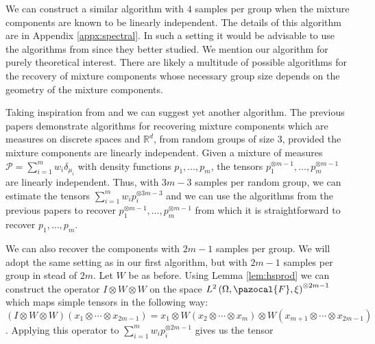 \documentclass[aos,preprint]{imsart}
\def\rn{\mathbb{R}}
\def\sF{\pazocal{F}}
\def\sP{\mathscr{P}}
\theoremstyle{plain}
\theoremstyle{defintion}
\begin{document}
We can construct a similar algorithm with $4$ samples per group when the mixture components are known to be linearly independent. The details of this algorithm are in Appendix \ref{appx:spectral}. In such a setting it would be advisable to use the algorithms from \cite{anandkumar14,song14} since they better studied. We mention our algorithm for purely theoretical interest. There are likely a multitude of possible algorithms for the recovery of mixture components whose necessary group size depends on the geometry of the mixture components.

Taking inspiration from \cite{anandkumar14} and \cite{song14} we can suggest yet another algorithm.  The previous papers demonstrate algorithms for recovering mixture components which are measures on discrete spaces and $\rn^d$, from random groups of size 3, provided the mixture components are linearly independent. Given a mixture of measures $\sP = \sum_{i=1}^m w_i \delta_{\mu_i}$ with density functions $p_1,\ldots,p_m$, the tensors $p_1^{\otimes m-1}, \ldots , p_m^{\otimes m-1}$ are linearly independent. Thus, with $3m-3$ samples per random group, we can estimate the tensors $\sum_{i=1}^{m} w_i p_i^{\otimes 3m-3}$ and we can use the algorithms from the previous papers to recover $p_1^{\otimes m-1},\ldots,p_m^{\otimes m-1}$ from which it is straightforward to recover $p_1,\ldots,p_m$.

We can also recover the components with $2m-1$ samples per group. We will adopt the same setting as in our first algorithm, but with $2m-1$ samples per group in stead of $2m$. Let $W$ be as before. Using Lemma \ref{lem:hsprod} we can construct the operator $I\otimes W \otimes W$ on the space $L^2\left( \Omega,\sF,\xi \right)^{\otimes 2m-1}$ which maps simple tensors in the following way: $(I \otimes W \otimes W)\left( x_1\otimes \cdots \otimes x_{2m-1} \right) = x_1 \otimes W\left( x_2\otimes \cdots \otimes x_{m}  \right) \otimes W\left( x_{m+1}\otimes \cdots \otimes x_{2m-1} \right)$. Applying this operator to $\sum_{i=1}^m w_i p_i^{\otimes 2m-1}$ gives us the tensor
\end{document}
